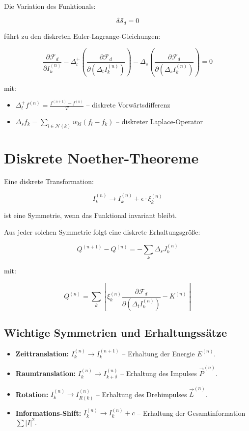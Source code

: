 Die Variation des Funktionals:

\[
\delta \mathcal{S}_d = 0
\]

führt zu den diskreten Euler-Lagrange-Gleichungen:

\[
\frac{\partial \mathcal{F}_d}{\partial I_k^{(n)}} - \Delta_t^+ \left( \frac{\partial \mathcal{F}_d}{\partial (\Delta_t I_k^{(n)})} \right) - \Delta_s \left( \frac{\partial \mathcal{F}_d}{\partial (\Delta_s I_k^{(n)})} \right) = 0
\]

mit:
\begin{itemize}
\item \( \Delta_t^+ f^{(n)} = \frac{f^{(n+1)} - f^{(n)}}{T} \) – diskrete Vorwärtsdifferenz
\item \( \Delta_s f_k = \sum_{l \in \mathcal{N}(k)} w_{kl}(f_l - f_k) \) – diskreter Laplace-Operator
\end{itemize}

\section{Diskrete Noether-Theoreme}

Eine diskrete Transformation:

\[
I_k^{(n)} \to I_k^{(n)} + \epsilon \cdot \xi_k^{(n)}
\]

ist eine Symmetrie, wenn das Funktional invariant bleibt.

Aus jeder solchen Symmetrie folgt eine diskrete Erhaltungsgröße:

\[
Q^{(n+1)} - Q^{(n)} = -\sum_k \Delta_s J_k^{(n)}
\]

mit:

\[
Q^{(n)} = \sum_k \left[ \xi_k^{(n)} \frac{\partial \mathcal{F}_d}{\partial (\Delta_t I_k^{(n)})} - K^{(n)} \right]
\]

\subsection{Wichtige Symmetrien und Erhaltungssätze}

\begin{itemize}
\item \textbf{Zeittranslation:} \( I_k^{(n)} \to I_k^{(n+1)} \) – Erhaltung der Energie \( E^{(n)} \).
\item \textbf{Raumtranslation:} \( I_k^{(n)} \to I_{k+\delta}^{(n)} \) – Erhaltung des Impulses \( \vec{P}^{(n)} \).
\item \textbf{Rotation:} \( I_k^{(n)} \to I_{R(k)}^{(n)} \) – Erhaltung des Drehimpulses \( \vec{L}^{(n)} \).
\item \textbf{Informations-Shift:} \( I_k^{(n)} \to I_k^{(n)} + c \) – Erhaltung der Gesamtinformation \( \sum |I|^2 \).
\end{itemize}

